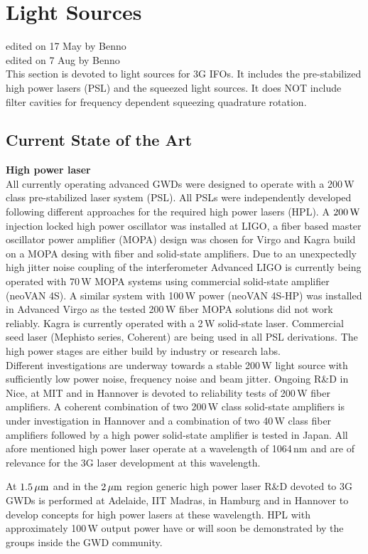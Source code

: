 \section{Light Sources}
{\color{blue} edited on 17 May by Benno\\
	edited on 7 Aug by Benno}\\
This section is devoted to light sources for 3G IFOs. It includes the pre-stabilized high power lasers (PSL) and the squeezed light sources. It does NOT include filter cavities for frequency dependent squeezing quadrature rotation. 
\subsection{Current State of the Art}

{\bf High power laser}\\
All currently operating advanced GWDs were designed to operate with a 200\,W class pre-stabilized laser system (PSL). All PSLs were independently developed following different approaches for the required high power lasers (HPL). A $ 200\,{\rm W} $ injection locked high power oscillator was installed at LIGO, a fiber based master oscillator power amplifier (MOPA) design was chosen for Virgo and Kagra build on a MOPA desing with fiber and solid-state amplifiers. Due to an unexpectedly high jitter noise coupling of the interferometer Advanced LIGO is currently being operated with 70\,W MOPA systems using commercial solid-state amplifier (neoVAN 4S). A similar system with 100\,W power (neoVAN 4S-HP) was installed in Advanced Virgo as the tested 200\,W fiber MOPA solutions did not work reliably. Kagra is currently operated with a 2\,W solid-state laser. Commercial seed laser (Mephisto series, Coherent) are being used in all PSL derivations. The high power stages are either build by industry or research labs.  \\
Different investigations are underway towards a stable 200\,W light source with sufficiently low power noise, frequency noise and beam jitter. 
Ongoing R\&D in Nice, at MIT and in Hannover is devoted to reliability tests of 200\,W fiber amplifiers. A coherent combination of two 200\,W class solid-state amplifiers is under investigation in Hannover and a combination of two 40\,W class fiber amplifiers followed by a high power solid-state amplifier is tested in Japan.
All afore mentioned high power laser operate at a wavelength of 1064\,nm and are of relevance for the 3G laser development at this wavelength.

At $ 1.5\, {\rm \mu m}$ and in the $ 2\, {\rm \mu m}$ region generic high power laser R\&D devoted to 3G GWDs is performed at Adelaide, IIT Madras, in Hamburg and in Hannover to develop concepts for high power lasers at these wavelength. HPL with approximately 100\,W output power have or will soon be demonstrated by the groups inside the GWD community. 


